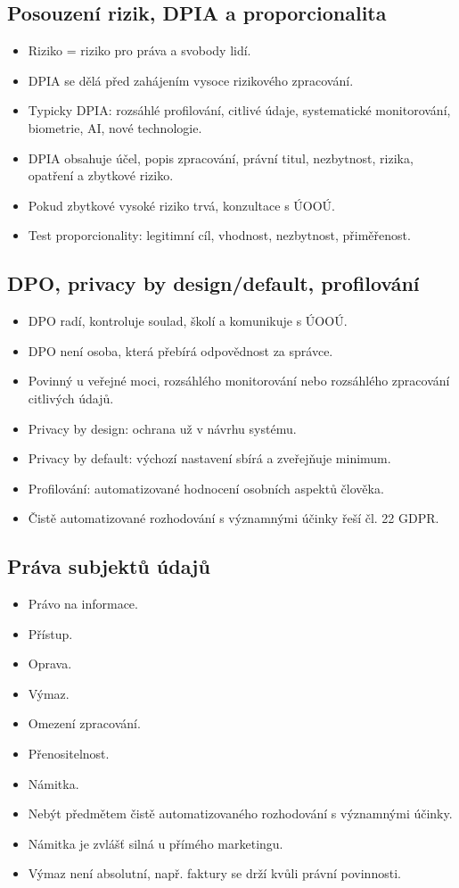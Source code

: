 \documentclass[10pt,a4paper]{article}
\newcommand{\blok}[1]{\subsection*{#1}}
\begin{document}
\blok{Posouzení rizik, DPIA a proporcionalita}
\begin{itemize}
  \item Riziko = riziko pro práva a svobody lidí.
  \item DPIA se dělá před zahájením vysoce rizikového zpracování.
  \item Typicky DPIA: rozsáhlé profilování, citlivé údaje, systematické monitorování, biometrie, AI, nové technologie.
  \item DPIA obsahuje účel, popis zpracování, právní titul, nezbytnost, rizika, opatření a zbytkové riziko.
  \item Pokud zbytkové vysoké riziko trvá, konzultace s ÚOOÚ.
  \item Test proporcionality: legitimní cíl, vhodnost, nezbytnost, přiměřenost.
\end{itemize}

\blok{DPO, privacy by design/default, profilování}
\begin{itemize}
  \item DPO radí, kontroluje soulad, školí a komunikuje s ÚOOÚ.
  \item DPO není osoba, která přebírá odpovědnost za správce.
  \item Povinný u veřejné moci, rozsáhlého monitorování nebo rozsáhlého zpracování citlivých údajů.
  \item Privacy by design: ochrana už v návrhu systému.
  \item Privacy by default: výchozí nastavení sbírá a zveřejňuje minimum.
  \item Profilování: automatizované hodnocení osobních aspektů člověka.
  \item Čistě automatizované rozhodování s významnými účinky řeší čl. 22 GDPR.
\end{itemize}

\blok{Práva subjektů údajů}
\begin{itemize}
  \item Právo na informace.
  \item Přístup.
  \item Oprava.
  \item Výmaz.
  \item Omezení zpracování.
  \item Přenositelnost.
  \item Námitka.
  \item Nebýt předmětem čistě automatizovaného rozhodování s významnými účinky.
  \item Námitka je zvlášť silná u přímého marketingu.
  \item Výmaz není absolutní, např. faktury se drží kvůli právní povinnosti.
\end{itemize}
\end{document}
